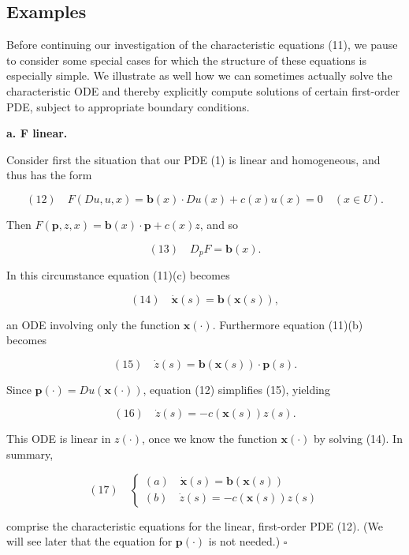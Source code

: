 \subsection{Examples}
\label{sec:characteristics-examples}

Before continuing our investigation of the characteristic equations (11), we pause to consider some special cases for which the structure of these equations is especially simple. We illustrate as well how we can sometimes actually solve the characteristic ODE and thereby explicitly compute solutions of certain first-order PDE, subject to appropriate boundary conditions.

\textbf{a. F linear.}

Consider first the situation that our PDE (1) is linear and homogeneous, and thus has the form

$$(12) \quad F(Du, u, x) = \mathbf{b}(x) \cdot Du(x) + c(x)u(x) = 0 \quad (x \in U).$$

Then $F(\mathbf{p}, z, x) = \mathbf{b}(x) \cdot \mathbf{p} + c(x)z$, and so

$$(13) \quad D_p F = \mathbf{b}(x).$$

In this circumstance equation (11)(c) becomes

$$(14) \quad \dot{\mathbf{x}}(s) = \mathbf{b}(\mathbf{x}(s)),$$

an ODE involving only the function $\mathbf{x}(\cdot)$. Furthermore equation (11)(b) becomes

$$(15) \quad \dot{z}(s) = \mathbf{b}(\mathbf{x}(s)) \cdot \mathbf{p}(s).$$

Since $\mathbf{p}(\cdot) = Du(\mathbf{x}(\cdot))$, equation (12) simplifies (15), yielding

$$(16) \quad \dot{z}(s) = -c(\mathbf{x}(s))z(s).$$

This ODE is linear in $z(\cdot)$, once we know the function $\mathbf{x}(\cdot)$ by solving (14).
In summary,

$$(17) \quad \left\{\begin{array}{l} (a) \quad \dot{\mathbf{x}}(s) = \mathbf{b}(\mathbf{x}(s)) \\ (b) \quad \dot{z}(s) = -c(\mathbf{x}(s))z(s) \end{array}\right.$$

comprise the characteristic equations for the linear, first-order PDE (12).
(We will see later that the equation for $\mathbf{p}(\cdot)$ is not needed.) $\square$

